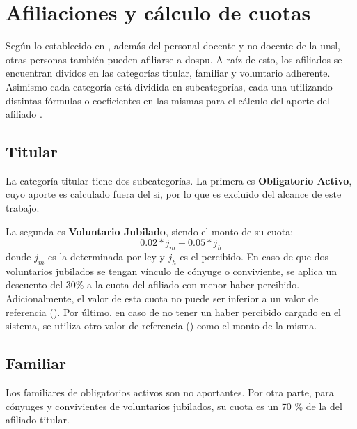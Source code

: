 \section{Afiliaciones y cálculo de cuotas}\label{sec:afiliaciones}

Según lo establecido en \cite{CSOrd53}, además del personal docente y no docente de la \acrshort{unsl}, otras personas también pueden afiliarse a \acrshort{dospu}.
%
A raíz de esto, los afiliados se encuentran dividos en las categorías titular, familiar y voluntario adherente. Asimismo cada categoría está dividida en subcategorías, cada una utilizando distintas fórmulas o coeficientes en las mismas para el cálculo del aporte del afiliado  \cite{dospuRes21}. 

\subsection{Titular} 
\label{sec:titular}

La categoría titular tiene dos subcategorías.
La primera es \textbf{Obligatorio Activo}, cuyo aporte es calculado fuera del \acrshort{si}, por lo que es excluido del alcance de este trabajo.


La segunda es \textbf{Voluntario Jubilado}, siendo el monto de su cuota: 
\begin{displaymath}
0.02 * j_m + 0.05 * j_h
\end{displaymath}
donde $j_m$ es la  determinada por ley y $j_h$ es el  percibido.
%
En caso de que dos voluntarios jubilados se tengan vínculo de cónyuge o conviviente, se aplica un descuento del 30\% a la cuota del afiliado con menor haber percibido.
%
Adicionalmente, el valor de esta cuota no puede ser inferior a un valor de referencia ().
%
Por último, en caso de no tener un haber percibido cargado en el sistema, se utiliza otro valor de referencia () como el monto de la misma.

\subsection{Familiar} 
\label{sec:familiar}
Los familiares de obligatorios activos son no aportantes.
%
Por otra parte, para cónyuges y convivientes de voluntarios jubilados, su cuota es un 70 \% de la del afiliado titular.

